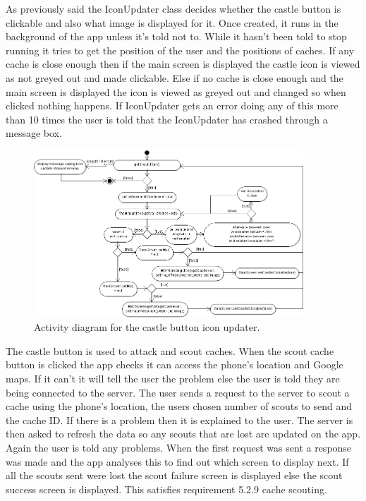 As previously said the IconUpdater class decides whether the castle button is clickable and also what image is displayed for it. Once created, it runs in the background of the app unless it's told not to. While it hasn't been told to stop running it tries to get the position of the user and the positions of caches. If any cache is close enough then if the main screen is displayed the castle icon is viewed as not greyed out and made clickable. Else if no cache is close enough and the main screen is displayed the icon is viewed as greyed out and changed so when clicked nothing happens. If IconUpdater gets an error doing any of this more than 10 times the user is told that the IconUpdater has crashed through a message box.

\newpage
\begin{figure}
    \centering
    \includegraphics[width=0.9\textwidth]{images/activity/iconUpdator}
    \caption{Activity diagram for the castle button icon updater.}
\end{figure}

The castle button is used to attack and scout caches. When the scout cache button is clicked the app checks it can access the phone's location and Google maps. If it can't it will tell the user the problem else the user is told they are being connected to the server. The user sends a request to the server to scout a cache using the phone's location, the users chosen number of scouts to send and the cache ID. If there is a problem then it is explained to the user. The server is then asked to refresh the data so any scouts that are lost are updated on the app. Again the user is told any problems. When the first request was sent a response was made and the app analyses this to find out which screen to display next. If all the scouts sent were lost the scout failure screen is displayed else the scout success screen is displayed. This satisfies requirement 5.2.9 cache scouting.

